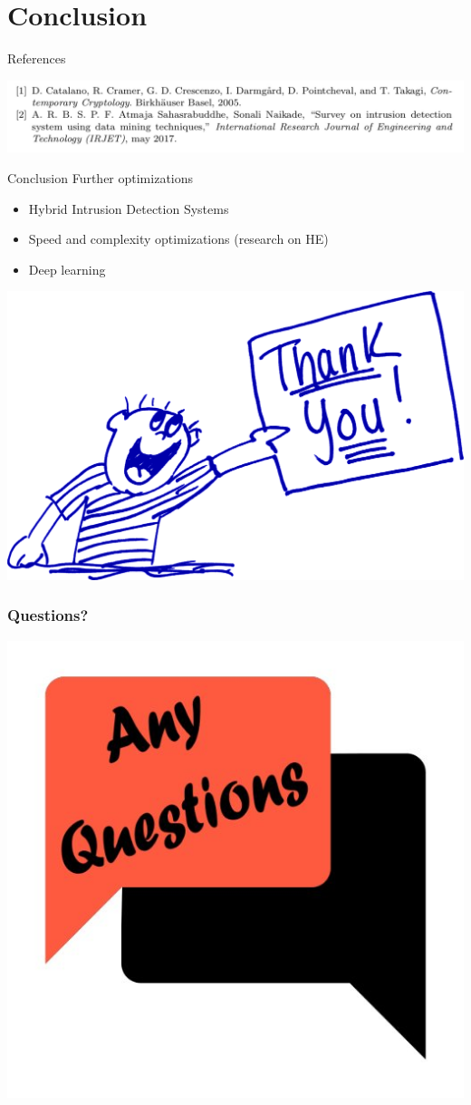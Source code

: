 \documentclass[11pt,t]{beamer}
\begin{document}
\section{Conclusion}
\begin{frame}{References}
\begin{center}
    \includegraphics[width=\textwidth]{bib}
\end{center}
\end{frame}
\begin{frame}{Conclusion}
Further optimizations
\begin{itemize}
    \item Hybrid Intrusion Detection Systems
    \item Speed and complexity optimizations (research on HE)
    \item Deep learning
\end{itemize}
\begin{center}
    \includegraphics[width=.5\textwidth]{thankyou}
\end{center}
\end{frame}
\begin{frame}
\frametitle{Questions?}
\begin{center}
    \includegraphics[width=\textwidth,height=0.8\textheight,keepaspectratio]{graphics/questions.jpg}
\end{center}
\end{frame}
\end{document}
